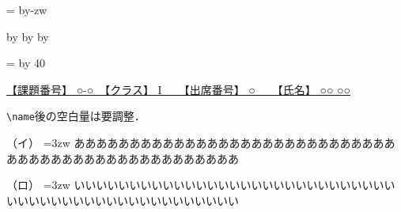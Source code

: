 \documentclass[uplatex]{jsarticle}
\makeatletter
\def\mojiparline#1{
\newcounter{mpl}
\setcounter{mpl}{#1}
\@tempdima=\linewidth
\advance\@tempdima by-\value{mpl}zw
\addtocounter{mpl}{-1}
\divide\@tempdima by \value{mpl}
\advance\kanjiskip by\@tempdima
\advance\parindent by\@tempdima
}
\def\linesparpage#1{
\baselineskip=\textheight
\divide\baselineskip by #1
}
\newcommand{\myname}{○○ ○○}
\newcommand{\mynum}{○}
\makeatother
\begin{document}
\mojiparline{40}
\linesparpage{40}
\pagestyle{empty}
\begin{flushleft}
\textsf{
\underline{
【課題番号】 ○-○　【クラス】 I　　【出席番号】 \mynum　　【氏名】 \myname\hspace{6.5em}
}
}
\end{flushleft}

\verb|\name|後の空白量は要調整．

\noindent
（イ）
\hangindent=3zw
\hspace{0zw}
ああああああああああああああああああああああああああああああああああああああああああああああああああ

\noindent
（ロ）
\hangindent=3zw
\hspace{0zw}
いいいいいいいいいいいいいいいいいいいいいいいいいいいいいいいいいいいいいいいいいいいいいいいいいい
\end{document}
